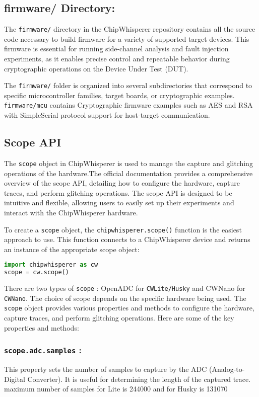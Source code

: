 \subsection*{firmware/ Directory:}
The \texttt{firmware/} directory in the ChipWhisperer repository contains all the source code necessary to build firmware for a variety of supported target devices. This firmware is essential for running side-channel analysis and fault injection experiments, as it enables precise control and repeatable behavior during cryptographic operations on the Device Under Test (DUT).

The \texttt{firmware/} folder is organized into several subdirectories that correspond to specific microcontroller families, target boards, or cryptographic examples. \texttt{firmware/mcu} contains Cryptographic firmware examples such as AES and RSA with SimpleSerial protocol support for host-target communication.

\subsection{Scope API}
The \texttt{scope} object in ChipWhisperer is used to manage the capture and glitching operations of the hardware.The official documentation \cite{chipwhisperer_scope_api} provides a comprehensive overview of the scope API, detailing how to configure the hardware, capture traces, and perform glitching operations. The scope API is designed to be intuitive and flexible, allowing users to easily set up their experiments and interact with the ChipWhisperer hardware.

To create a \texttt{scope} object,  the 
\texttt{chipwhisperer.scope()} function is the easiest approach to use. This function connects to a ChipWhisperer device and returns an instance of the appropriate scope object:

\begin{lstlisting}[language=Python]
import chipwhisperer as cw
scope = cw.scope()
\end{lstlisting}

There are two types of \texttt{scope} : OpenADC for \texttt{CWLite/Husky} and CWNano for \texttt{CWNano}. The choice of scope depends on the specific hardware being used.
The \texttt{scope} object provides various properties and methods to configure the hardware, capture traces, and perform glitching operations. Here are some of the key properties and methods:
\subsubsection{\textbf{\texttt{scope.adc.samples} :}}
This property sets the number of samples to capture by the  ADC (Analog-to-Digital Converter). It is useful for determining the length of the captured trace.
maximum number of samples for Lite is 244000 and for Husky is 131070

